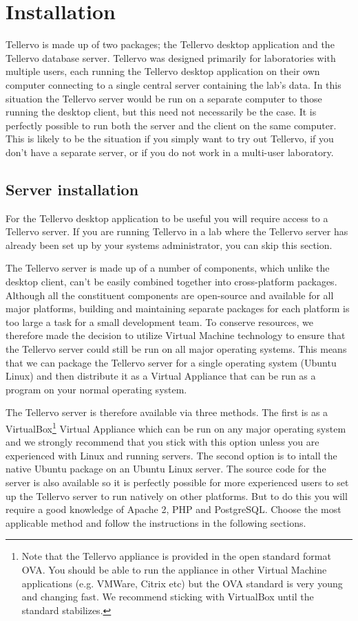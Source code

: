 
\chapter{Installation}
\label{txt:installation}
Tellervo is made up of two packages; the Tellervo desktop application and the Tellervo database server.  Tellervo was designed primarily for laboratories with multiple users, each running the Tellervo desktop application on their own computer connecting to a single central server containing the lab's data.  In this situation the Tellervo server would be run on a separate computer to those running the desktop client, but this need not necessarily be the case.  It is perfectly possible to run both the server and the client on the same computer.  This is likely to be the situation if you simply want to try out Tellervo, if you don't have a separate server, or if you do not work in a multi-user laboratory.


\section{Server installation}
For the Tellervo desktop application to be useful you will require access to a Tellervo server.  If you are running Tellervo in a lab where the Tellervo server has already been set up by your systems administrator, you can skip this section.

The Tellervo server is made up of a number of components, which unlike the desktop client, can't be easily combined together into cross-platform packages.  Although all the constituent components are open-source and available for all major platforms, building and maintaining separate packages for each platform is too large a task for a small development team.  To conserve resources, we therefore made the decision to utilize Virtual Machine technology to ensure that the Tellervo server could still be run on all major operating systems.  This means that we can package the Tellervo server for a single operating system (Ubuntu Linux) and then distribute it as a Virtual Appliance that can be run as a program on your normal operating system. 

The Tellervo server is therefore available via three methods.  The first is as a VirtualBox\footnote{Note that the Tellervo appliance is provided in the open standard format OVA.  You should be able to run the appliance in other Virtual Machine applications (e.g. VMWare, Citrix etc) but the OVA standard is very young and changing fast.  We recommend sticking with VirtualBox until the standard stabilizes. } Virtual Appliance which can be run on any major operating system and we strongly recommend that you stick with this option unless you are experienced with Linux and running servers.  The second option is to intall the native Ubuntu package on an Ubuntu Linux server. The source code for the server is also available so it is perfectly possible for more experienced users to set up the Tellervo server to run natively on other platforms.  But to do this you will require a good knowledge of Apache 2, PHP and PostgreSQL.  Choose the most applicable method and follow the instructions in the following sections.


